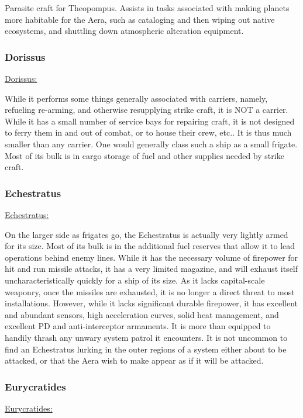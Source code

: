 Parasite craft for Theopompus. Assists in tasks associated with making
planets more habitable for the Aera, such as cataloging and then
wiping out native ecosystems, and shuttling down atmospheric
alteration equipment.


\subsubsection{Dorissus}
\href{http://vegastrike.sourceforge.net/wiki/Vessel:Dorissus}{Dorissus:}

While it performs some things generally associated with carriers,
namely, refueling re-arming, and otherwise resupplying strike craft,
it is NOT a carrier. While it has a small number of service bays for
repairing craft, it is not designed to ferry them in and out of
combat, or to house their crew, etc.. It is thus much smaller than any
carrier. One would generally class such a ship as a small
frigate. Most of its bulk is in cargo storage of fuel and other
supplies needed by strike craft.

\subsubsection{Echestratus}

\href{http://vegastrike.sourceforge.net/wiki/Vessel:Echestratus}{Echestratus:}

On the larger side as frigates go, the Echestratus is actually very
lightly armed for its size. Most of its bulk is in the additional fuel
reserves that allow it to lead operations behind enemy lines. While it
has the necessary volume of firepower for hit and run missile attacks,
it has a very limited magazine, and will exhaust itself
uncharacteristically quickly for a ship of its size. As it lacks
capital-scale weaponry, once the missiles are exhausted, it is no
longer a direct threat to most installations. However, while it lacks
significant durable firepower, it has excellent and abundant sensors,
high acceleration curves, solid heat management, and excellent PD and
anti-interceptor armaments. It is more than equipped to handily thrash
any unwary system patrol it encounters. It is not uncommon to find an
Echestratus lurking in the outer regions of a system either about to
be attacked, or that the Aera wish to make appear as if it will be
attacked.



\subsubsection{Eurycratides}
\href{http://vegastrike.sourceforge.net/wiki/Vessel:Eurycratides}{Eurycratides:}

